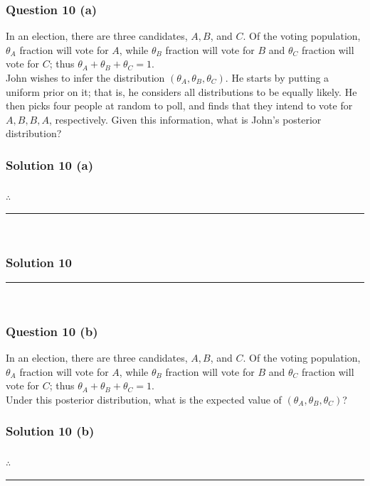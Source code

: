 \documentclass{article}
\begin{document}
\subsubsection*{Question 10 (a)}
\begin{flushleft}
In an election, there are three candidates, $A, B$, and $C$. Of the voting population, $\theta_{A}$ fraction will vote for $A$, while $\theta_{B}$ fraction will vote for $B$ and $\theta_{C}$ fraction will vote for $C$; thus $\theta_{A}+\theta_{B}+\theta_{C}=1$.\\

John wishes to infer the distribution $\left(\theta_{A}, \theta_{B}, \theta_{C}\right)$. He starts by putting a uniform prior on it; that is, he considers all distributions to be equally likely. He then picks four people at random to poll, and finds that they intend to vote for $A, B, B, A$, respectively. Given this information, what is John's posterior distribution?
\end{flushleft}

\subsubsection*{Solution 10 (a)}

\subsubsection*{\normalfont}{$\therefore$ } \\

\noindent\rule{\textwidth}{0.4pt}\\

\newpage

\subsubsection*{Solution 10}
\noindent\rule{\textwidth}{0.4pt}\\
\subsubsection*{Question 10 (b)}
\begin{flushleft}
In an election, there are three candidates, $A, B$, and $C$. Of the voting population, $\theta_{A}$ fraction will vote for $A$, while $\theta_{B}$ fraction will vote for $B$ and $\theta_{C}$ fraction will vote for $C$; thus $\theta_{A}+\theta_{B}+\theta_{C}=1$.\\

Under this posterior distribution, what is the expected value of $\left(\theta_{A}, \theta_{B}, \theta_{C}\right)$?
\end{flushleft}


\subsubsection*{Solution 10 (b)}

\subsubsection*{\normalfont}{$\therefore$ } \\

\noindent\rule{\textwidth}{0.4pt}\\

\newpage
\end{document}
